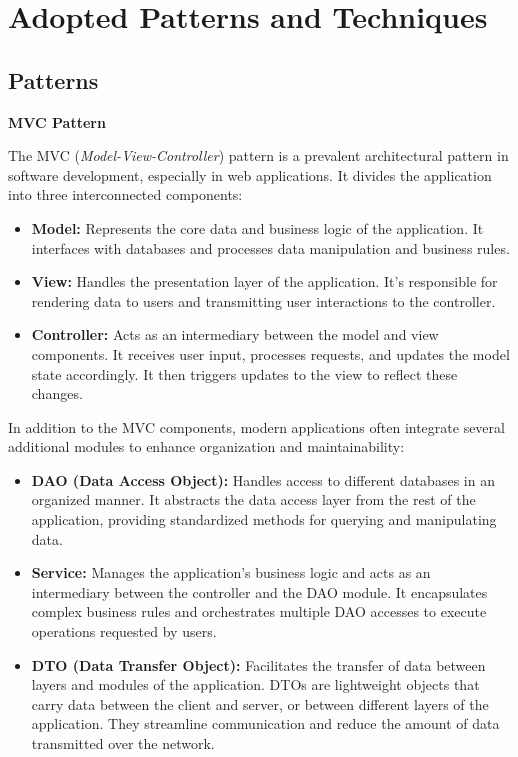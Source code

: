 \section{Adopted Patterns and Techniques}
\subsection*{Patterns}

\textbf{MVC Pattern}

The MVC (\textit{Model-View-Controller}) pattern is a prevalent architectural pattern in software development, especially in web 
applications. It divides the application into three interconnected components:

\begin{itemize}
\item \textbf{Model:} Represents the core data and business logic of the application. It interfaces with databases and processes 
data manipulation and business rules.

\item \textbf{View:} Handles the presentation layer of the application. It's responsible for rendering data to users and 
transmitting user interactions to the controller.

\item \textbf{Controller:} Acts as an intermediary between the model and view components. It receives user input, 
processes requests, and updates the model state accordingly. It then triggers updates to the view to reflect these changes.
\end{itemize}

\vspace{\baselineskip}

In addition to the MVC components, modern applications often integrate several additional modules to enhance organization and maintainability:

\begin{itemize}
\item \textbf{DAO (Data Access Object):} Handles access to different databases in an organized manner. It abstracts the data
access layer from the rest of the application, providing standardized methods for querying and manipulating data.

\item \textbf{Service:} Manages the application's business logic and acts as an intermediary between the controller and the 
DAO module. It encapsulates complex business rules and orchestrates multiple DAO accesses to execute operations requested by users.

\item \textbf{DTO (Data Transfer Object):} Facilitates the transfer of data between layers and modules of the application. 
DTOs are lightweight objects that carry data between the client and server, or between different layers of the application. 
They streamline communication and reduce the amount of data transmitted over the network.
\end{itemize}


